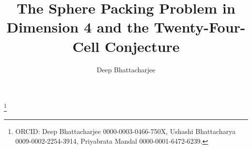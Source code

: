 \documentclass[11pt,reqno]{amsart}
\renewcommand{\_}{\origunderscore\allowbreak}
\numberwithin{equation}{section}
\theoremstyle{plain}
\theoremstyle{definition}
\theoremstyle{remark}
\DeclareMathOperator{\vol}{vol}
\begin{document}
\title[The sphere packing problem in dimension 4]{The Sphere Packing Problem in
Dimension 4 and the Twenty-Four-Cell Conjecture}

\author[D. Bhattacharjee]{Deep Bhattacharjee}
\address{Formerly, Electro-Gravitational Space Propulsion Laboratory (EGSPL),
Bhubaneswar, Odisha 751030, India}
\thanks{ORCID: Deep Bhattacharjee 0000-0003-0466-750X,
Ushashi Bhattacharya 0009-0002-2254-3914,
Priyabrata Mandal 0000-0001-6472-6239.}
\end{document}
